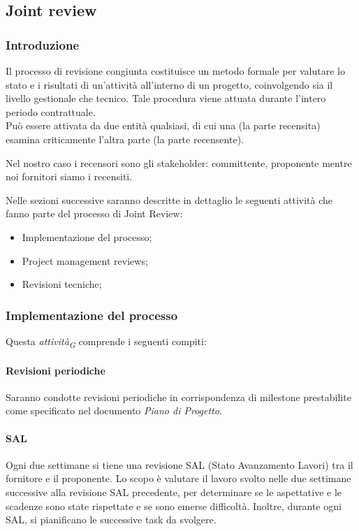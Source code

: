 \subsection{Joint review} 

\subsubsection{Introduzione}
Il processo di revisione congiunta costituisce un metodo formale per valutare lo stato e i risultati di un'attività all'interno di un progetto, coinvolgendo sia il livello gestionale che tecnico. Tale procedura viene attuata durante l'intero periodo contrattuale. \\
Può essere attivata da due entità qualsiasi, di cui una (la parte recensita) esamina criticamente l'altra parte (la parte recensente).

Nel nostro caso i recensori sono gli stakeholder: committente, proponente mentre noi fornitori siamo i recensiti.

Nelle sezioni successive saranno descritte in dettaglio le seguenti attività che fanno parte del processo di Joint Review:
\begin{itemize}
    \item Implementazione del processo;
    \item Project management reviews;
    \item Revisioni tecniche;
\end{itemize}

\subsubsection{Implementazione del processo}
Questa \textit{attività}\textsubscript{\textit{G}} comprende i seguenti compiti: 

\paragraph{Revisioni periodiche}
Saranno condotte revisioni periodiche in corrispondenza di milestone prestabilite come specificato nel documento \textit{Piano di Progetto}.

\paragraph{SAL}
Ogni due settimane si tiene una revisione SAL (Stato Avanzamento Lavori) tra il fornitore e il proponente. Lo scopo è valutare il lavoro svolto nelle due settimane successive alla revisione SAL precedente, per determinare se le aspettative e le scadenze sono state rispettate e se sono emerse difficoltà. Inoltre, durante ogni SAL, si pianificano le successive task da svolgere.

